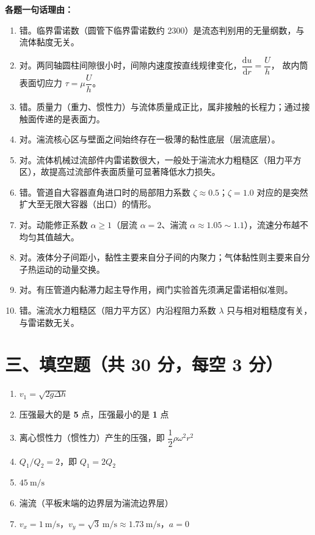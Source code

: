 \begin{tishi}
\textbf{各题一句话理由：}
\begin{enumerate}[label=\arabic*.,leftmargin=2.2em]
  \item 错。临界雷诺数（圆管下临界雷诺数约 2300）是流态判别用的无量纲数，与流体黏度无关。
  \item 对。两同轴圆柱间隙很小时，间隙内速度按直线规律变化，$\dfrac{\mathrm{d}u}{\mathrm{d}r}=\dfrac{U}{h}$，
        故内筒表面切应力 $\tau=\mu\dfrac{U}{h}$。
  \item 错。质量力（重力、惯性力）与流体质量成正比，属非接触的长程力；通过接触面传递的是表面力。
  \item 对。湍流核心区与壁面之间始终存在一极薄的黏性底层（层流底层）。
  \item 对。流体机械过流部件内雷诺数很大，一般处于湍流水力粗糙区（阻力平方区），故提高过流部件表面质量可显著降低水力损失。
  \item 错。管道自大容器直角进口时的局部阻力系数 $\zeta\approx0.5$；$\zeta=1.0$ 对应的是突然扩大至无限大容器（出口）的情形。
  \item 对。动能修正系数 $\alpha\ge1$（层流 $\alpha=2$、湍流 $\alpha\approx1.05\sim1.1$），流速分布越不均匀其值越大。
  \item 对。液体分子间距小，黏性主要来自分子间的内聚力；气体黏性则主要来自分子热运动的动量交换。
  \item 对。有压管道内黏滞力起主导作用，阀门实验首先须满足雷诺相似准则。
  \item 错。湍流水力粗糙区（阻力平方区）内沿程阻力系数 $\lambda$ 只与相对粗糙度有关，与雷诺数无关。
\end{enumerate}
\end{tishi}

\section{三、填空题（共 30 分，每空 3 分）}

\begin{enumerate}[label=\arabic*.,leftmargin=2.2em]
  \item $v_1=\sqrt{2g\Delta h}$
  \item 压强最大的是 \textbf{5} 点，压强最小的是 \textbf{1} 点
  \item 离心惯性力（惯性力）产生的压强，即 $\dfrac{1}{2}\rho\omega^{2}r^{2}$
  \item $Q_1/Q_2=2$，即 $Q_1=2Q_2$
  \item $45\ \mathrm{m/s}$
  \item 湍流（平板末端的边界层为湍流边界层）
  \item $v_x=1\ \mathrm{m/s}$，$v_y=\sqrt{3}\ \mathrm{m/s}\approx1.73\ \mathrm{m/s}$，$a=0$
\end{enumerate}

